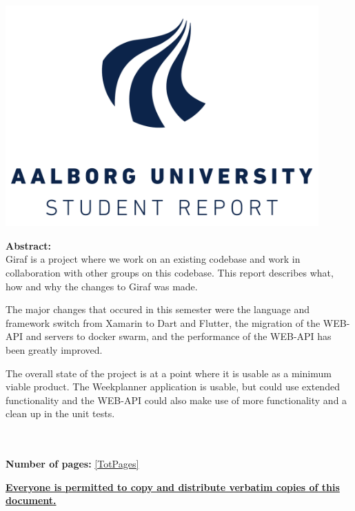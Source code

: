  ~
\begin{minipage}[T]{0.45\textwidth}
 \begin{flushright}
  \includegraphics[width=0.9\textwidth]{images/aau_logo.pdf}\\
 \end{flushright}
 \begin{flushleft}
  \textbf{Abstract:}\\
  Giraf is a project where we work on an existing codebase and work in collaboration with other groups on this codebase.
  This report describes what, how and why the changes to Giraf was made.
  
  The major changes that occured in this semester were the language and framework switch from Xamarin to Dart and Flutter, the migration of the WEB-API and servers to docker swarm, and the performance of the WEB-API has been greatly improved.
  
  The overall state of the project is at a point where it is usable as a minimum viable product.
  The Weekplanner application is usable, but could use extended functionality and the WEB-API could also make use of more functionality and a clean up in the unit tests.


 \end{flushleft}
\end{minipage}\\
\\\large{\textsf{\textbf{\normalsize{Number of pages:}}}} \ref{TotPages}\\
\begin{center}
 \begin{scriptsize}
  \textbf{\underline{Everyone is permitted to copy and distribute verbatim copies of this document.}}
 \end{scriptsize}
\end{center}
